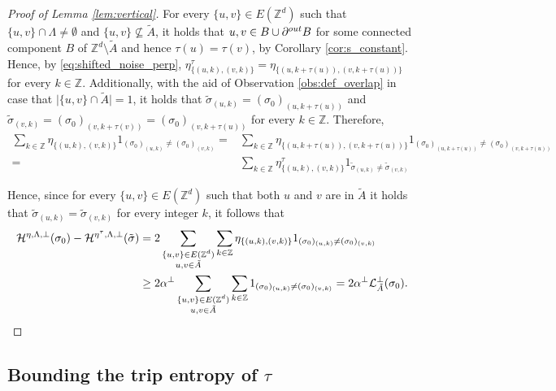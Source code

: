 \documentclass[11pt, reqno]{amsart}
\numberwithin{equation}{section}
\begin{document}
\begin{proof}[Proof of Lemma \ref{lem:vertical}]
For every $\{u,v\}\in E({\mathbb Z}^d)$ such that $\{u,v\}\cap\Lambda\neq\emptyset$ and $\{u,v\}\nsubseteq\tilde{A}$, it holds that $u,v\in B\cup\partial^{\rm out}B$ for some connected component $B$ of ${\mathbb Z}^d\setminus\tilde{A}$ and hence
${\tau}(u)={\tau}(v)$, by Corollary \ref{cor:s_constant}. 
Hence, by \eqref{eq:shifted_noise_perp}, $\eta^{\tau}_{\{(u,k),(v,k)\}}=\eta_{\{(u,k+\tau(u)),(v,k+\tau(u))\}}$ for every $k\in{\mathbb Z}$.
Additionally, with the aid of Observation \ref{obs:def_overlap} in case that $\lvert\{u,v\}\cap\tilde{A}\rvert=1$, it holds that $\tilde{\sigma}_{(u,k)}=(\sigma_0)_{(u,k+{\tau}(u))}$ and $\tilde{\sigma}_{(v,k)}=(\sigma_0)_{(v,k+{\tau}(v))}=(\sigma_0)_{(v,k+{\tau}(u))}$ for every $k\in{\mathbb Z}$. Therefore,
\begin{align*}
\sum_{k\in{\mathbb Z}}\eta_{\{(u,k),(v,k)\}}1_{(\sigma_0)_{(u,k)}\neq(\sigma_0)_{(v,k)}}
=&\sum_{k\in{\mathbb Z}}\eta_{\{(u,k+{\tau}(u)),(v,k+{\tau}(u))\}}1_{(\sigma_0)_{(u,k+{\tau}(u))}\neq(\sigma_0)_{(v,k+{\tau}(u))}}\\
=&\sum_{k\in{\mathbb Z}}\eta^{\tau}_{\{(u,k),(v,k)\}}1_{\tilde{\sigma}_{(u,k)}\neq\tilde{\sigma}_{(v,k)}}
\end{align*}

Hence, since for every $\{u,v\}\in E({\mathbb Z}^d)$ such that both $u$ and $v$ are in $\tilde{A}$ it holds that $\tilde{\sigma}_{(u,k)}=\tilde{\sigma}_{(v,k)}$ for every integer $k$, it follows that 
\begin{align*}
\mathcal{H}^{\eta,\Lambda,\perp}(\sigma_0)-
\mathcal{H}^{\eta^{\tau},\Lambda,\perp}(\tilde{\sigma})&=2\sum_{\substack{\{u,v\}\in E({\mathbb Z}^d)\\u,v\in\tilde{A}}}\sum_{k\in{\mathbb Z}}\eta_{\{(u,k),(v,k)\}}1_{(\sigma_0)_{(u,k)}\neq(\sigma_0)_{(v,k)}}\\
&\geq 2\alpha^{\perp}\sum_{\substack{\{u,v\}\in E({\mathbb Z}^d)\\u,v\in\tilde{A}}}\sum_{k\in{\mathbb Z}}1_{(\sigma_0)_{(u,k)}\neq(\sigma_0)_{(v,k)}}=2\alpha^{\perp}\mathcal{L}^{\perp}_{\tilde{A}}(\sigma_0).
\qedhere
\end{align*}
\end{proof}

\subsection{Bounding the trip entropy of ${\tau}$}
\end{document}
